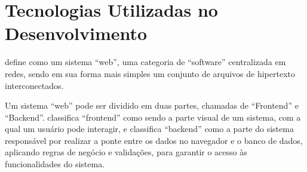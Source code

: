 \section{Tecnologias Utilizadas no Desenvolvimento}

 define como um sistema “web”, uma categoria de “software” centralizada em redes, sendo em sua forma mais simples um conjunto de arquivos de hipertexto interconectados.

Um sistema “web” pode ser dividido em duas partes, chamadas de “Frontend” e “Backend”.  classifica “frontend” como sendo a parte visual de um sistema, com a qual um usuário pode interagir, e classifica “backend” como a parte do sistema responsável por realizar a ponte entre os dados no navegador e o banco de dados, aplicando regras de negócio e validações, para garantir o acesso às funcionalidades do sistema.

